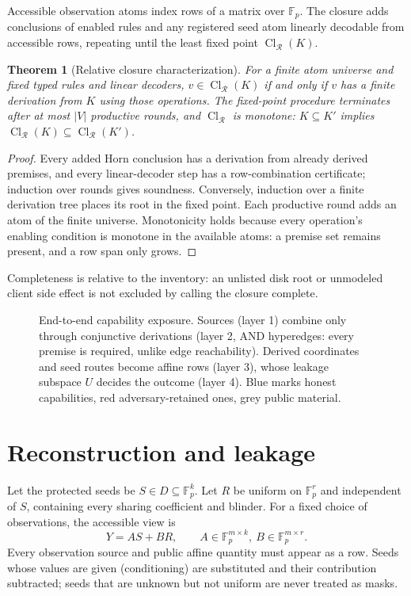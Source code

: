 \documentclass[pdflatex,sn-mathphys-num]{sn-jnl}
\theoremstyle{plain}
\newtheorem{theorem}{Theorem}
\theoremstyle{definition}
\newcommand{\Cl}{\operatorname{Cl}}
\newcommand{\F}{\mathbb{F}}
\begin{document}
Accessible observation atoms index rows of a matrix over $\F_p$. The closure adds conclusions of enabled rules and any registered seed atom linearly decodable from accessible rows, repeating until the least fixed point $\Cl_{\mathcal R}(K)$.

\begin{theorem}[Relative closure characterization]\label{thm:closure}
For a finite atom universe and fixed typed rules and linear decoders, $v\in\Cl_{\mathcal R}(K)$ if and only if $v$ has a finite derivation from $K$ using those operations. The fixed-point procedure terminates after at most $|V|$ productive rounds, and $\Cl_{\mathcal R}$ is monotone: $K\subseteq K'$ implies $\Cl_{\mathcal R}(K)\subseteq\Cl_{\mathcal R}(K')$.
\end{theorem}
\begin{proof}
Every added Horn conclusion has a derivation from already derived premises, and every linear-decoder step has a row-combination certificate; induction over rounds gives soundness. Conversely, induction over a finite derivation tree places its root in the fixed point. Each productive round adds an atom of the finite universe. Monotonicity holds because every operation's enabling condition is monotone in the available atoms: a premise set remains present, and a row span only grows.
\end{proof}

Completeness is relative to the inventory: an unlisted disk root or unmodeled client side effect is not excluded by calling the closure complete.

\begin{figure}[t]
\centering
\resizebox{\linewidth}{!}{}
\caption{End-to-end capability exposure. Sources (layer 1) combine only through conjunctive derivations (layer 2, AND hyperedges: every premise is required, unlike edge reachability). Derived coordinates and seed routes become affine rows (layer 3), whose leakage subspace $U$ decides the outcome (layer 4). Blue marks honest capabilities, red adversary-retained ones, grey public material.}\label{fig:capabilities}
\end{figure}


\section{Reconstruction and leakage}\label{sec:leakage}

Let the protected seeds be $S\in D\subseteq\F_p^k$. Let $R$ be uniform on $\F_p^r$ and independent of $S$, containing every sharing coefficient and blinder. For a fixed choice of observations, the accessible view is
\begin{equation}\label{eq:view}
 Y=AS+BR,\qquad A\in\F_p^{m\times k},\ B\in\F_p^{m\times r}.
\end{equation}
Every observation source and public affine quantity must appear as a row. Seeds whose values are given (conditioning) are substituted and their contribution subtracted; seeds that are unknown but not uniform are never treated as masks.
\end{document}
